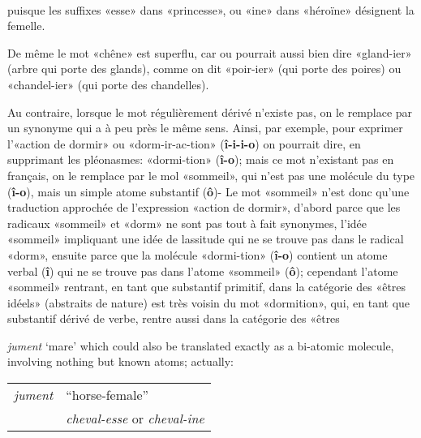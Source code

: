 \begin{sloppypar}
{{    \noindent
    \\[1ex]
    
    \noindent
    puisque les suffixes «esse» dans «princesse», ou «ine» dans
    «héroïne» désignent la femelle.

    De même le mot «chêne» est superflu, car ou pourrait aussi bien
    dire «gland-ier» (arbre qui porte des glands), comme on dit
    «poir-ier» (qui porte des poires) ou «chandel-ier» (qui porte des
    chandelles).

    Au contraire, lorsque le mot régulièrement dérivé n’existe pas, on
    le remplace par un synonyme qui a à peu près le même sens. Ainsi,
    par exemple, pour exprimer l’«action de dormir» ou
    «dorm-ir-ac-tion» (\textbf{î-i-i-o}) on pourrait dire, en
    supprimant les pléonasmes: «dormi-tion» (\textbf{î-o}); mais ce
    mot n’existant pas en français, on le remplace par le mol
    «sommeil», qui n’est pas une molécule du type (\textbf{î-o}), mais
    un simple atome substantif (\textbf{ô})- Le mot «sommeil» n'est
    donc qu’une traduction approchée de l’expression «action de
    dormir», d’abord parce que les radicaux «sommeil» et «dorm» ne
    sont pas tout à fait synonymes, l'idée «sommeil» impliquant une
    idée de lassitude qui ne se trouve pas dans le radical «dorm»,
    ensuite parce que la molécule «dormi-tion» (\textbf{î-o}) contient
    un atome verbal (\textbf{î}) qui ne se trouve pas dans l’atome
    «sommeil» (\textbf{ô}); cependant l’atome «sommeil» rentrant, en
    tant que substantif primitif, dans la catégorie des «êtres idéels»
    (abstraits de nature) est très voisin du mot «dormition», qui, en
    tant que substantif dérivé de verbe, rentre aussi dans la
    catégorie des «êtres}%
}
%
{\noindent
  {\small \emph{jument} `mare' which could also be translated exactly as
    a bi-atomic molecule, involving nothing but known atoms; actually:\\[1ex]

    \noindent
    \begin{tabular}[t]{@{}l@{ = }l}
      \emph{jument}&``horse-female''\\
                &\emph{cheval-esse} or \emph{cheval-ine\footnotemark}
    \end{tabular}\\[1ex]
    
}}
\end{sloppypar}
